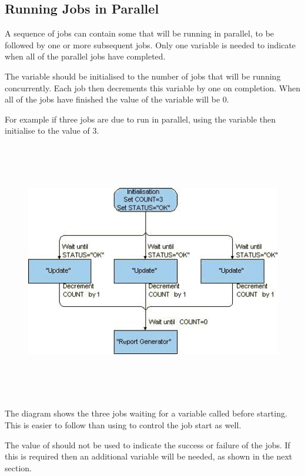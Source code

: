 \subsection{Running Jobs in Parallel}
A sequence of jobs can contain some that will be running in parallel, to be followed by one or more subsequent jobs. Only one variable is needed
to indicate when all of the parallel jobs have completed.

The variable should be initialised to the number of jobs that will be running concurrently. Each job then decrements this variable by one on
completion. When all of the jobs have finished the value of the variable will be 0.

For example if three jobs are due to run in parallel, using the variable  then initialise  to the value of 3.

\begin{figure}
\centering
\includegraphics[width=16.743cm,height=11.321cm]{img/ref8.jpg}
\end{figure}

The diagram shows the three jobs waiting for a variable called  before starting. This is easier to follow
than using  to control the job start as well.

The value of  should not be used to indicate the success or failure of the jobs. If this is required then an
additional variable will be needed, as shown in the next section.

